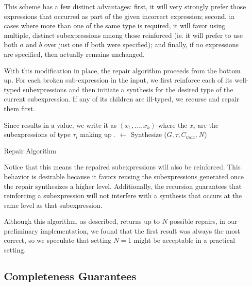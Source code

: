 This scheme has a few distinct advantages: first, it will very
strongly prefer those expressions that occurred as part of the given
incorrect expression; second, in cases where more than one of the same
type is required, it will favor using multiple, distinct
subexpressions among those reinforced (ie. it will prefer to use both
$a$ and $b$ over just one if both were specified); and finally, if no
expressions are specified, then \Cost actually remains unchanged.

With this modification in place, the repair algorithm proceeds from
the bottom up. For each broken sub-expression in the input, we first
reinforce each of its well-typed subexpressions and then initiate a
synthesis for the desired type of the current subexpression. If any of
its children are ill-typed, we recurse and repair them first.
\begin{algorithm}
\Output{\Repairs}
\BlankLine
{}
Since \Expr results in a value, we write it as \Expr$(x_1, \ldots, x_k)$ where the $x_i$ are the subexpressions of type $\tau_i$ making up \Expr.
\Repairs $\longleftarrow$ Synthesize ($G, \tau, C_{max}, N$)
\caption{Repair Algorithm}\label{proc:repair}
\end{algorithm}
Notice that this means the repaired subexpressions will also be
reinforced. This behavior is desirable because it favors reusing the
subexpressions generated once the repair synthesizes a higher
level. Additionally, the recursion guarantees that reinforcing a
subexpression will not interfere with a synthesis that occurs at the
same level as that subexpression.

Although this algorithm, as described, returns up to $N$ possible
repairs, in our preliminary implementation, we found that the first
result was always the most correct, so we speculate that setting $N=1$ might be
acceptable in a practical setting.

\iffalse

\subsection{Completeness Guarantees}

